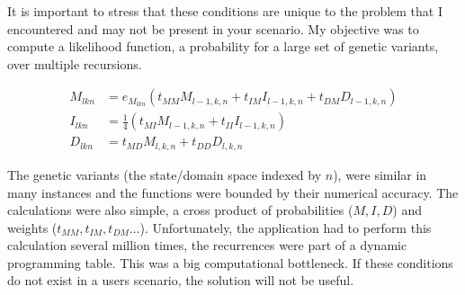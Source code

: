 \documentclass{article}
\begin{document}
It is important to stress that these conditions are unique to the problem that
I encountered and may not be present in your scenario.
My objective was to compute a likelihood function,
a probability for a large set of genetic variants,
over multiple recursions.

\begin{align}
  M_{lkn} &= e_{M_{lkn}}(t_{MM}M_{l-1,k,n} + t_{IM}I_{l-1,k,n} + t_{DM}D_{l-1,k,n})
  \nonumber \\
  I_{lkn} &= \frac{1}{4}(t_{MI}M_{l-1,k,n} + t_{II}I_{l-1,k,n}) \nonumber \\
  D_{lkn} &= t_{MD}M_{l,k,n} + t_{DD}D_{l,k,n} \nonumber
\end{align}

The genetic variants (the state/domain space indexed by $n$),
were similar in many instances and the functions were
bounded by their numerical accuracy.
The calculations were also simple,
a cross product of probabilities ($M, I, D$) and weights ($t_{MM}, t_{IM}, t_{DM} \ldots$).
Unfortunately,
the application had to perform this calculation several million times,
the recurrences were part of a dynamic programming table.
This was a big computational bottleneck.
If these conditions do not exist in a users scenario,
the solution will not be useful.
\end{document}
